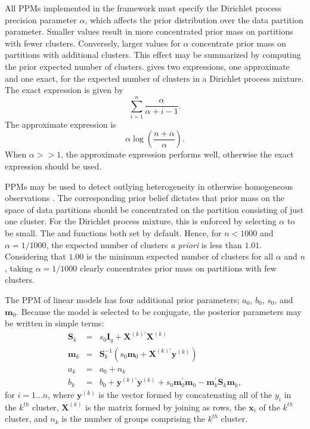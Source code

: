 \documentclass[article, nojss]{jss}
\newcommand{\bx}{\boldsymbol{x}}
\newcommand{\bX}{\boldsymbol{X}}
\newcommand{\bI}{\boldsymbol{I}}
\newcommand{\by}{\boldsymbol{y}}
\newcommand{\bm}{\boldsymbol{m}}
\newcommand{\bS}{\boldsymbol{S}}
\begin{document}
All PPMs implemented in the  framework must specify the Dirichlet process precision parameter $\alpha$, which affects the prior distribution over the data partition parameter. Smaller values result in more concentrated prior mass on partitions with fewer clusters. Conversely, larger values for $\alpha$ concentrate prior mass on partitions with additional clusters. This effect may be summarized by computing the prior expected number of clusters. \citet{Antoniak1974} gives two expressions, one approximate and one exact, for the expected number of clusters in a Dirichlet process mixture. The exact expression is given by \[\sum_{i = 1}^n \frac{\alpha}{\alpha + i - 1}.\] The approximate expression is \[\alpha \log\left(\frac{n + \alpha}{\alpha}\right).\] When $\alpha >> 1$, the approximate expression performs well, otherwise the exact expression should be used.

PPMs may be used to detect outlying heterogeneity in otherwise homogeneous observations \citep{ShotwellSlate2011}. The corresponding prior belief dictates that prior mass on the space of data partitions should be concentrated on the partition consisting of just one cluster. For the Dirichlet process mixture, this is enforced by selecting $\alpha$ to be small. The  and  functions both set  by default. Hence, for $n < 1000$ and $\alpha = 1/1000$, the expected number of clusters {\it a priori} is less than $1.01$. Considering that $1.00$ is the minimum expected number of clusters for all $\alpha$ and $n$, taking $\alpha = 1/1000$ clearly concentrates prior mass on partitions with few clusters.

The PPM of linear models has four additional prior parameters; $a_0$, $b_0$, $s_0$, and $\bm_0$. Because the model is selected to be conjugate, the posterior parameters may be written in simple terms:
\begin{eqnarray}
\bS_k & = & s_0 \bI_{q} + \bX^{(k)\prime} \bX^{(k)} \nonumber \\
\bm_k & = & \bS_k^{-1}(s_0 \bm_0 + \bX^{(k)\prime} \by^{(k)}) \nonumber \\
a_k  & = & a_0 + n_k \nonumber \\
b_k  & = & b_0 + \by^{(k)\prime}\by^{(k)} + s_0\bm_0^{\prime}\bm_0 - \bm_k^{\prime}\bS_k\bm_k, \label{posterior_stats}
\end{eqnarray}
for $i=1\ldots n$, where $\by^{(k)}$ is the vector formed by concatenating all of the $y_{i}$ in the $k^{th}$ cluster, $\bX^{(k)}$ is the matrix formed by joining as rows, the $\bx_{i}$ of the $k^{th}$ cluster, and $n_k$ is the number of groups comprising the $k^{th}$ cluster.
\end{document}
